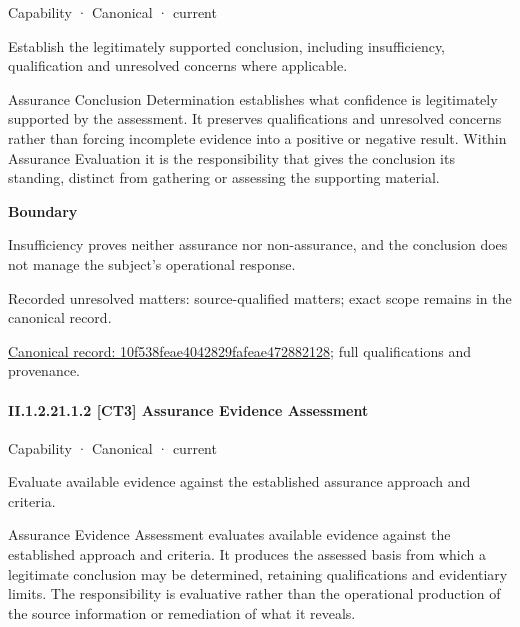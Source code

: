\label{element:10f538feae4042829fafeae472882128}
{\small Capability · Canonical · current}\par

Establish the legitimately supported conclusion, including insufficiency, qualification and unresolved concerns where applicable.



Assurance Conclusion Determination establishes what confidence is legitimately supported by the assessment. It preserves qualifications and unresolved concerns rather than forcing incomplete evidence into a positive or negative result. Within Assurance Evaluation it is the responsibility that gives the conclusion its standing, distinct from gathering or assessing the supporting material.



\textbf{Boundary}



Insufficiency proves neither assurance nor non-assurance, and the conclusion does not manage the subject's operational response.


{\small Recorded unresolved matters: source-qualified matters; exact scope remains in the canonical record.}\par
{\footnotesize \href{../../../../continuum/strategy/capability/10f538feae4042829fafeae472882128.md}{Canonical record: 10f538feae4042829fafeae472882128}; full qualifications and provenance.}\par
\paragraph*{II.1.2.21.1.2 [CT3] Assurance Evidence Assessment}
\label{navigation:II.1.2.21.1.2}

\label{element:1b295763b37f4622bd1bb80c6ea3741c}
{\small Capability · Canonical · current}\par

Evaluate available evidence against the established assurance approach and criteria.



Assurance Evidence Assessment evaluates available evidence against the established approach and criteria. It produces the assessed basis from which a legitimate conclusion may be determined, retaining qualifications and evidentiary limits. The responsibility is evaluative rather than the operational production of the source information or remediation of what it reveals.



